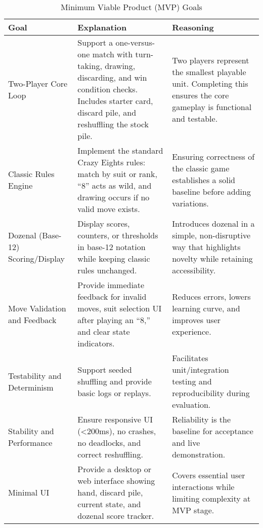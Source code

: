 \documentclass{article}
\begin{document}
    \begin{table}[h!]
        \caption{Minimum Viable Product (MVP) Goals} \label{TblMVPGoals}
        \begin{tabularx}{\textwidth}{|l|X|X|}
            \hline
            \textbf{Goal} & \textbf{Explanation} & \textbf{Reasoning} \\
            \hline
            Two-Player Core Loop & Support a one-versus-one match with turn-taking, drawing, discarding, and win condition checks. Includes starter card, discard pile, and reshuffling the stock pile. & Two players represent the smallest playable unit. Completing this ensures the core gameplay is functional and testable. \\
            \hline
            Classic Rules Engine & Implement the standard Crazy Eights rules: match by suit or rank, “8” acts as wild, and drawing occurs if no valid move exists. & Ensuring correctness of the classic game establishes a solid baseline before adding variations. \\
            \hline
            Dozenal (Base-12) Scoring/Display & Display scores, counters, or thresholds in base-12 notation while keeping classic rules unchanged. & Introduces dozenal in a simple, non-disruptive way that highlights novelty while retaining accessibility. \\
            \hline
            Move Validation and Feedback & Provide immediate feedback for invalid moves, suit selection UI after playing an “8,” and clear state indicators. & Reduces errors, lowers learning curve, and improves user experience. \\
            \hline
            Testability and Determinism & Support seeded shuffling and provide basic logs or replays. & Facilitates unit/integration testing and reproducibility during evaluation. \\
            \hline
            Stability and Performance & Ensure responsive UI (<200ms), no crashes, no deadlocks, and correct reshuffling. & Reliability is the baseline for acceptance and live demonstration. \\
            \hline
            Minimal UI & Provide a desktop or web interface showing hand, discard pile, current state, and dozenal score tracker. & Covers essential user interactions while limiting complexity at MVP stage. \\
            \hline
        \end{tabularx}
    \end{table}
\end{document}

